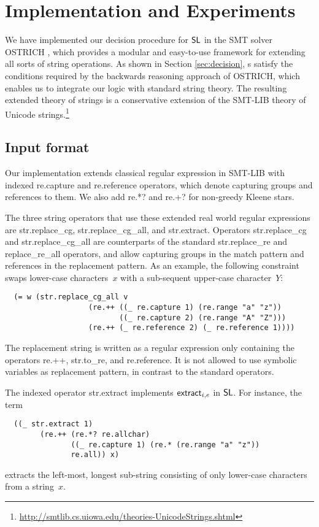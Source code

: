 \section{Implementation and Experiments}
\label{sect:impl}

We have implemented our decision procedure for $\mathsf{SL}$ in the SMT
solver OSTRICH \cite{CHL+19}, which provides a modular and easy-to-use
framework for extending all sorts of string operations. As shown in
Section \ref{sec:decision}, \PSST s satisfy the conditions required by
the backwards reasoning approach of OSTRICH, which enables us to
integrate our logic with standard string theory. The resulting
extended theory of strings is a conservative extension of the SMT-LIB
theory of Unicode strings.\footnote{\url{http://smtlib.cs.uiowa.edu/theories-UnicodeStrings.shtml}}

\subsection{Input format}

Our implementation extends classical regular expression in SMT-LIB
with indexed {\sf re.capture} and {\sf re.reference} operators, which
denote capturing groups and references to them. We also add {\sf re.*?}
and {\sf re.+?} for non-greedy Kleene stars.

The three string operators that use these extended real world regular
expressions are {\sf str.replace\_cg}, {\sf str.replace\_cg\_all}, and
{\sf str.extract}. Operators {\sf str.replace\_cg} and {\sf
  str.replace\_cg\_all} are counterparts of the standard {\sf
  str.replace\_re} and {\sf replace\_re\_all} operators, and allow
capturing groups in the match pattern and references in the
replacement pattern. As an example, the following constraint swaps
lower-case characters~$x$ with a sub-sequent upper-case character~$Y$:
%
\begin{verbatim}
  (= w (str.replace_cg_all v
                   (re.++ ((_ re.capture 1) (re.range "a" "z"))
                          ((_ re.capture 2) (re.range "A" "Z")))
                   (re.++ (_ re.reference 2) (_ re.reference 1))))
\end{verbatim}
%
The replacement string is written as a regular expression only
containing the operators {\sf re.++}, {\sf str.to\_re}, and {\sf
  re.reference}. It is not allowed to use symbolic variables as
replacement pattern, in contrast to the standard operators.

The indexed operator {\sf str.extract} implements $\mathsf{extract}_{i, e}$ in
$\mathsf{SL}$. For instance, the term
%
\begin{verbatim}
  ((_ str.extract 1)
        (re.++ (re.*? re.allchar)
               ((_ re.capture 1) (re.* (re.range "a" "z"))
               re.all)) x)
\end{verbatim}
%
extracts the left-most, longest sub-string consisting of only lower-case
characters from a string~$x$.

